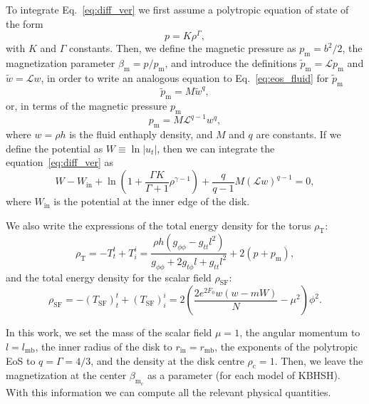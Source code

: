 \documentclass[twocolumn,aps,showpacs,showkeys,prd,superscriptaddress,byrevtex, amsmath]{revtex4-1}
\begin{document}
To integrate Eq.~\eqref{eq:diff_ver} we first assume a polytropic equation of state of the form
\begin{equation}\label{eq:eos_fluid}
p = K \rho^{\Gamma},
\end{equation}
with $K$ and $\Gamma$ constants.
Then, we define the magnetic pressure as $p_{\mathrm{m}} = b^2/2$, the magnetization parameter $\beta_{\mathrm{m}} = p/p_{\mathrm{m}}$, and introduce the definitions $\tilde{p}_{\mathrm{m}} = \mathcal{L} p_{\mathrm{m}}$ and $\tilde{w} = \mathcal{L} w$, in order to write an analogous equation to Eq.~\eqref{eq:eos_fluid} for $\tilde{p}_{\mathrm{m}}$
\begin{equation}\label{eq:eos_mag_tilde}
\tilde{p}_{\mathrm{m}} = M \tilde{w}^q,
\end{equation}
or, in terms of the magnetic pressure $p_{\mathrm{m}}$
\begin{equation}\label{eq:eos_mag}
p_{\mathrm{m}} = M \mathcal{L}^{q-1} w^q,
\end{equation}
where $w = \rho h$ is the fluid enthaply density, and $M$ and $q$ are constants.
If we define the potential as $W \equiv \ln |u_t|$, then we can integrate the equation~\eqref{eq:diff_ver} as
\begin{equation}\label{eq:final}
W - W_{\mathrm{in}} + \ln \left(1 + \frac{\Gamma K}{\Gamma +1}\rho^{\gamma -1}\right) + \frac{q}{q-1}M(\mathcal{L}w)^{q-1}=0,
\end{equation}
where $W_{\mathrm{in}}$ is the potential at the inner edge of the disk.

We also write the expressions of the total energy density for the torus $\rho_{\mathrm{T}}$:
\begin{equation}\label{eq:torus_energy_density}
\rho_{\mathrm{T}} = -T^t_t + T^i_i = \frac{\rho h (g_{\phi\phi} - g_{tt} l^2)}{g_{\phi\phi} + 2 g_{t\phi} l + g_{tt} l^2} + 2 (p + p_{\mathrm{m}}),
\end{equation}
and the total energy density for the scalar field $\rho_{\mathrm{SF}}$:
\begin{equation}\label{eq:SF_energy_density}
\rho_{\mathrm{SF}} = -(T_{\mathrm{SF}})^t_t + (T_{\mathrm{SF}})^i_i = 2 \left(\frac{2 e^{2 F_0} w (w-m W)}{N} - \mu^2\right) \phi^2.
\end{equation}

In this work, we set the mass of the scalar field $\mu = 1$, the angular momentum to $l = l_{\mathrm{mb}}$, the inner radius of the disk to $r_{\mathrm{in}} = r_{\mathrm{mb}}$, the exponents of the polytropic EoS to $q = \Gamma = 4/3$, and the density at the disk centre $\rho_{\mathrm{c}} = 1$. Then, we leave the magnetization at the center $\beta_{\mathrm{m_c}}$ as a parameter (for each model of KBHSH). With this information we can compute all the relevant physical quantities.
\end{document}
